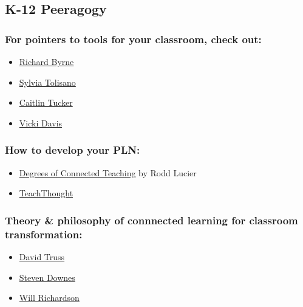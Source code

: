 \subsection{K-12 Peeragogy}\label{rec:k-12-peeragogy}

\subsubsection{For pointers to tools for your classroom, check
out:}\label{rec:for-pointers-to-tools-for-your-classroom-check-out}

\begin{itemize}
\itemsep1pt\parskip0pt
\item
  \href{http://www.freetech4teachers.com/}{Richard Byrne}
\item
  \href{http://langwitches.org/blog/}{Sylvia Tolisano}
\item
  \href{http://catlintucker.com/2011/11/12-tech-tools-that-will-transform-your-classroom/}{Caitlin
  Tucker}
\item
  \href{http://coolcatteacher.blogspot.ca/}{Vicki Davis}
\end{itemize}

\subsubsection{How to develop your PLN:}\label{rec:how-to-develop-your-pln}

\begin{itemize}
\itemsep1pt\parskip0pt
\item
  \href{\%20http://thecleversheep.blogspot.ca/2012/06/seven-degrees-of-connectedness_06.html}{Degrees
  of Connected Teaching} by Rodd Lucier
\item
  \href{\%20http://thecleversheep.blogspot.ca/2012/06/seven-degrees-of-connectedness_06.html}{TeachThought}
\end{itemize}

\subsubsection{Theory \& philosophy of connnected learning for classroom
transformation:}\label{rec:theory-philosophy-of-connnected-learning-for-classroom-transformation}

\begin{itemize}
\itemsep1pt\parskip0pt
\item
  \href{http://pairadimes.davidtruss.com/}{David Truss}
\item
  \href{http://www.downes.ca/presentation/264}{Steven Downes}
\item
  \href{http://willrichardson.com/}{Will Richardson}
\end{itemize}


